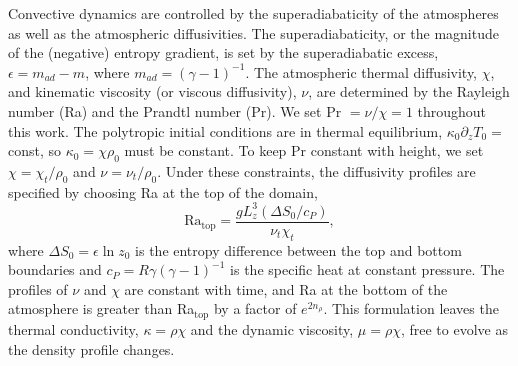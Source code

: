 \documentclass[aps, prl, twocolumn, nofootinbib, groupedaddress, amsfonts, amssymb, amsmath]{revtex4-1}
\begin{document}
Convective dynamics are controlled by the superadiabaticity
of the atmospheres as well as the atmospheric diffusivities.
The superadiabaticity, or the magnitude of the (negative) 
entropy gradient, is set by 
the superadiabatic excess, $\epsilon = m_{ad} - m$, where 
$m_{ad} = (\gamma - 1)^{-1}$.
The atmospheric thermal diffusivity, $\chi$,
and kinematic viscosity (or viscous diffusivity), $\nu$,
are determined by the Rayleigh number (Ra) and the Prandtl
number (Pr).  We set $\text{Pr } = \nu/\chi = 1$ throughout
this work. The polytropic initial conditions are in
thermal equilibrium, $\kappa_0 \partial_z T_0 =$ const,
so $\kappa_0 = \chi \rho_0$ must be constant. To keep
Pr constant with height, we set $\chi = \chi_t/\rho_0$
and $\nu = \nu_t/\rho_0$.  Under these constraints, the
diffusivity profiles are specified by choosing Ra
at the top of the domain,
\begin{equation}
\text{Ra}_{\text{top}} = \frac{g L_z^3 (\Delta S_0 / c_P)}{\nu_t\chi_t},
\end{equation}
where $\Delta S_0 = \epsilon\ln z_0$ is the entropy difference 
between the top and bottom boundaries and
$c_P = R\gamma(\gamma-1)^{-1}$ is the specific heat 
at constant pressure. The profiles of $\nu$ and $\chi$ are constant with
time, and Ra at the bottom of the atmosphere is greater than Ra$_{\text{top}}$
by a factor of $e^{2n_{\rho}}$.  This formulation leaves
the thermal conductivity, $\kappa = \rho\chi$ and
the dynamic viscosity, $\mu = \rho\chi$, free to evolve
as the density profile changes.
\end{document}
